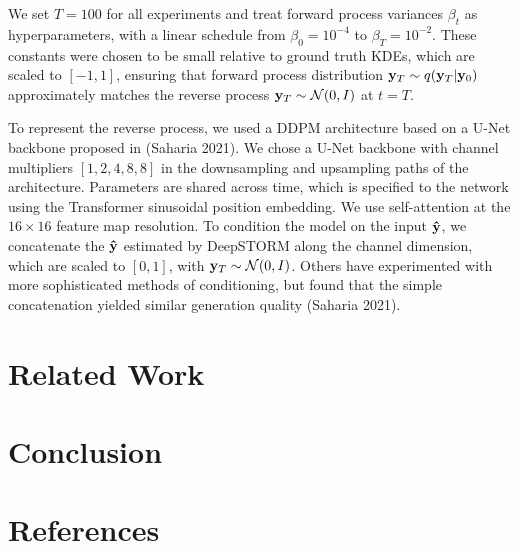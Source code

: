 \documentclass{article}
\begin{document}
We set $T = 100$ for all experiments and treat forward process variances $\beta_{t}$ as hyperparameters, with a linear schedule from $\beta_{0}=10^{-4}$ to $\beta_{T}=10^{-2}$.
These constants were chosen to be small relative to ground truth KDEs, which are scaled to $[-1,1]$, ensuring that forward process distribution $\bold{y}_{T}\sim q(\bold{y}_{T}|\bold{y}_{0})$ approximately matches the reverse process $\bold{y}_T\sim \mathcal{N}(0, I)$ at $t=T$.

To represent the reverse process, we used a DDPM architecture based on a U-Net backbone proposed in (Saharia 2021). We chose a U-Net backbone with channel multipliers $[1,2,4,8,8]$ in the downsampling and upsampling paths of the architecture. Parameters are shared across time, which is specified to the network using the Transformer sinusoidal position embedding. We use self-attention at the $16 \times 16$ feature map resolution. To condition the model on the input $\bold{\hat{y}}$, we concatenate the $\bold{\hat{y}}$ estimated by DeepSTORM along the channel dimension, which are scaled to $[0,1]$, with $\bold{y}_T\sim \mathcal{N}(0, I)$. Others have experimented with more sophisticated methods of conditioning, but found that the simple concatenation yielded similar generation quality (Saharia 2021). 


\section{Related Work}



\section{Conclusion}



\section*{References}
\end{document}
